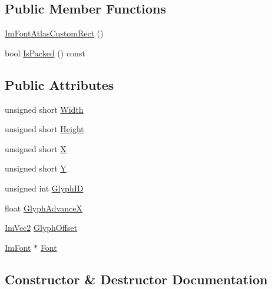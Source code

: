 \subsection*{Public Member Functions}
\begin{DoxyCompactItemize}
\item 
\hyperlink{structImFontAtlasCustomRect_adbff2d8e8b86be21e28406aaa913becf}{Im\+Font\+Atlas\+Custom\+Rect} ()
\item 
bool \hyperlink{structImFontAtlasCustomRect_a8829c3c64981078ba03d75c2b07e2abc}{Is\+Packed} () const
\end{DoxyCompactItemize}
\subsection*{Public Attributes}
\begin{DoxyCompactItemize}
\item 
unsigned short \hyperlink{structImFontAtlasCustomRect_ada0c5ae3700d9074280c0801dd9ae20e}{Width}
\item 
unsigned short \hyperlink{structImFontAtlasCustomRect_a94a6da45f46f0cc5abfd6580abfb2f0c}{Height}
\item 
unsigned short \hyperlink{structImFontAtlasCustomRect_a4e653e0c1855c48c4fc0b830ed696aed}{X}
\item 
unsigned short \hyperlink{structImFontAtlasCustomRect_adda5fb1f5bfeb194bd5fc27b635db338}{Y}
\item 
unsigned int \hyperlink{structImFontAtlasCustomRect_a697df6d4ccdaac2077c43cdc1b5435a4}{Glyph\+ID}
\item 
float \hyperlink{structImFontAtlasCustomRect_a062a08fee260f08e669231e602682617}{Glyph\+AdvanceX}
\item 
\hyperlink{structImVec2}{Im\+Vec2} \hyperlink{structImFontAtlasCustomRect_a03f4d8c267b53dd7981560b0fb5b8b03}{Glyph\+Offset}
\item 
\hyperlink{structImFont}{Im\+Font} $\ast$ \hyperlink{structImFontAtlasCustomRect_ae0b05bcab100beb72c96c4a606c61b3a}{Font}
\end{DoxyCompactItemize}


\subsection{Constructor \& Destructor Documentation}
\mbox{\label{structImFontAtlasCustomRect_adbff2d8e8b86be21e28406aaa913becf}} 
